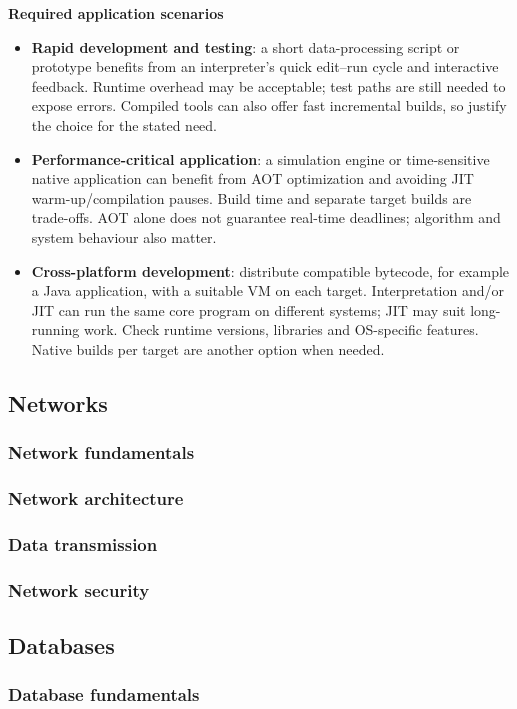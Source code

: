 \documentclass[a4paper,12pt]{article}
\begin{document}
\textbf{Required application scenarios}
\begin{itemize}
    \item \textbf{Rapid development and testing}: a short data-processing script or prototype benefits from an interpreter's quick edit--run cycle and interactive feedback. Runtime overhead may be acceptable; test paths are still needed to expose errors. Compiled tools can also offer fast incremental builds, so justify the choice for the stated need.
    \item \textbf{Performance-critical application}: a simulation engine or time-sensitive native application can benefit from AOT optimization and avoiding JIT warm-up/compilation pauses. Build time and separate target builds are trade-offs. AOT alone does not guarantee real-time deadlines; algorithm and system behaviour also matter.
    \item \textbf{Cross-platform development}: distribute compatible bytecode, for example a Java application, with a suitable VM on each target. Interpretation and/or JIT can run the same core program on different systems; JIT may suit long-running work. Check runtime versions, libraries and OS-specific features. Native builds per target are another option when needed.
\end{itemize}
\endgroup

\subsection{Networks}
\subsubsection{Network fundamentals}
\subsubsection{Network architecture}
\subsubsection{Data transmission}
\subsubsection{Network security}
\subsection{Databases}
\subsubsection{Database fundamentals}
\end{document}
